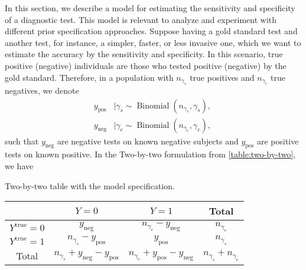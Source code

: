 In this section, we describe a model for estimating the sensitivity and
specificity of a diagnostic test. This model is relevant to analyze and
experiment with different prior specification approaches. Suppose having a
gold standard test and another test, for instance, a simpler, faster, or less
invasive one, which we want to estimate the accuracy by the sensitivity and
specificity. In this scenario,
true positive (negative) individuals are those who tested positive (negative) by
the gold standard. Therefore, in a population with $n_{\gamma_s}$ true
positives and  $n_{\gamma_e}$ true negatives, we denote
\begin{equation}
  \label{model:sensitivity-specificity}
  \begin{aligned}
    y_{\mathrm{pos}} & \mid \gamma_s \sim \operatorname{Binomial}(n_{\gamma_s}, \gamma_s),\ \\
    y_{\mathrm{neg}} & \mid \gamma_e \sim \operatorname{Binomial}(n_{\gamma_e}, \gamma_e),
  \end{aligned}
\end{equation}
such that $y_{\mathrm{neg}}$ are negative tests on known negative
subjects and $y_{\mathrm{pos}}$ are positive tests on
known positive. In the Two-by-two formulation from \autoref{table:two-by-two},
we have

\begin{quadro}[!ht]
  \centering
  \caption{\label{table:two-by-two-data}Two-by-two table with the model specification.}
  \begin{tabular}{c|c|c|c|}
    \cline{2-4}
                                                 & $Y = 0$                                              & $Y = 1$                           & Total          \\ \hline
    \multicolumn{1}{|c|}{$Y^{\mathrm{true}}= 0$} & $y_{\mathrm{neg}}$                                   & $n_{\gamma_e} - y_{\mathrm{neg}}$ & $n_{\gamma_e}$ \\ \hline
    \multicolumn{1}{|c|}{$Y^{\mathrm{true}}= 1$} & $n_{\gamma_s} -
    y_{\mathrm{pos}}$                            & $y_{\mathrm{pos}}$                                   & $n_{\gamma_s}$                                     \\ \hline
    \multicolumn{1}{|c|}{Total}                  & $n_{\gamma_s} + y_{\mathrm{neg}} -
    y_{\mathrm{pos}}$                            & $n_{\gamma_e} + y_{\mathrm{pos}} - y_{\mathrm{neg}}$ &
    $n_{\gamma_s} + n_{\gamma_e}$                                                                                                                            \\\hline
  \end{tabular}
\end{quadro}

